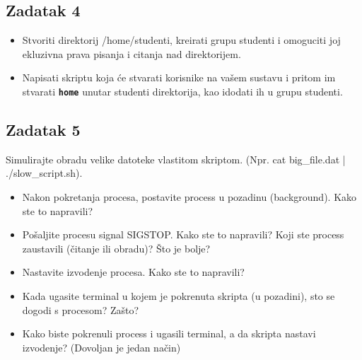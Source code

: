\documentclass[12pt,a4paper]{article}
\newcommand{\shell}[1]{\texttt{\textbf{#1}}}
\begin{document}
	\subsection*{Zadatak 4}
	\begin{itemize}
		\item Stvoriti direktorij /home/studenti, kreirati grupu studenti i omoguciti joj ekluzivna prava pisanja i citanja nad direktorijem.
    \item Napisati skriptu koja će stvarati korisnike na vašem sustavu i pritom im stvarati \shell{home} unutar studenti direktorija, kao idodati ih u grupu studenti. 
	\end{itemize}
  
	\subsection*{Zadatak 5}
  Simulirajte obradu velike datoteke vlastitom skriptom. (Npr. cat big\_file.dat | ./slow\_script.sh).
	\begin{itemize}
    \item Nakon pokretanja procesa, postavite process u pozadinu (background). Kako ste to napravili?
    \item Pošaljite procesu signal SIGSTOP. Kako ste to napravili? Koji ste process zaustavili (čitanje ili obradu)? Što je bolje?
    \item Nastavite izvodenje procesa. Kako ste to napravili?
    \item Kada ugasite terminal u kojem je pokrenuta skripta (u pozadini), sto se dogodi s procesom? Zašto?
    \item Kako biste pokrenuli process i ugasili terminal, a da skripta nastavi izvodenje? (Dovoljan je jedan način)
	\end{itemize}
\end{document}
